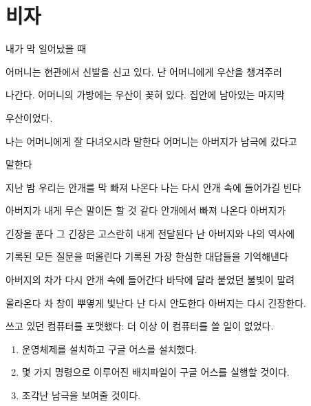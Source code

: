 \hypertarget{uxbe44uxc790}{%

\section{비자}\label{uxbe44uxc790}}



내가 막 일어났을 때



어머니는 현관에서 신발을 신고 있다. 난 어머니에게 우산을 챙겨주러

나간다. 어머니의 가방에는 우산이 꽂혀 있다. 집안에 남아있는 마지막

우산이었다.



나는 어머니에게 잘 다녀오시라 말한다 어머니는 아버지가 남극에 갔다고

말한다



지난 밤 우리는 안개를 막 빠져 나온다 나는 다시 안개 속에 들어가길 빈다

아버지가 내게 무슨 말이든 할 것 같다 안개에서 빠져 나온다 아버지가

긴장을 푼다 그 긴장은 고스란히 내게 전달된다 난 아버지와 나의 역사에

기록된 모든 질문을 떠올린다 기록된 가장 한심한 대답들을 기억해낸다

아버지의 차가 다시 안개 속에 들어간다 바닥에 달라 붙었던 불빛이 말려

올라온다 차 창이 뿌옇게 빛난다 난 다시 안도한다 아버지는 다시 긴장한다.



쓰고 있던 컴퓨터를 포맷했다: 더 이상 이 컴퓨터를 쓸 일이 없었다.



\begin{enumerate}

\def\labelenumi{\arabic{enumi}.}

\tightlist

\item

  운영체제를 설치하고 구글 어스를 설치했다.

\item

  몇 가지 명령으로 이루어진 배치파일이 구글 어스를 실행할 것이다.

\item

  조각난 남극을 보여줄 것이다.

\end{enumerate}



